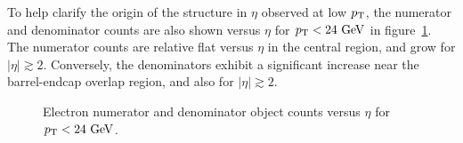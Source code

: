 To help clarify the origin of the structure in $\eta$ observed at low $p_{\text{T}}$, the numerator and denominator counts are also shown versus $\eta$ for $p_{\text{T}}<24~\mbox{GeV}$ in figure~\ref{fig:electron-num-den-eta-lowpt}. The numerator counts are relative flat versus $\eta$ in the central region, and grow for $|\eta|\gtrsim 2$. Conversely, the denominators exhibit a significant increase near the barrel-endcap overlap region, and also for $|\eta|\gtrsim 2$. 

\begin{figure}[h]
  \centering
  \caption{Electron numerator and denominator object counts versus $\eta$ for $p_{\text{T}}<24~\mbox{GeV}$.}
  \label{fig:electron-num-den-eta-lowpt}
\end{figure}


